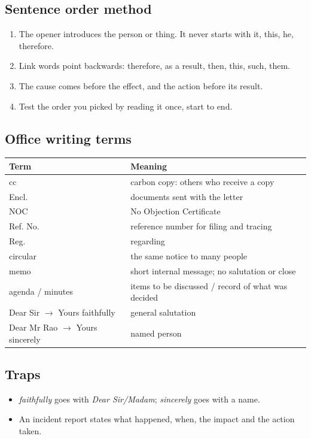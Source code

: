 \documentclass[11pt,a4paper]{article}
\begin{document}
\subsection*{Sentence order method}
\begin{enumerate}
\item The opener introduces the person or thing. It never starts with it, this, he, therefore.
\item Link words point backwards: therefore, as a result, then, this, such, them.
\item The cause comes before the effect, and the action before its result.
\item Test the order you picked by reading it once, start to end.
\end{enumerate}
\subsection*{Office writing terms}
\begin{center}\small\renewcommand{\arraystretch}{1.2}
\begin{tabularx}{\linewidth}{@{}>{\raggedright\arraybackslash}p{3.8cm} >{\raggedright\arraybackslash}X@{}}
\toprule
\textbf{Term} & \textbf{Meaning}\\
\midrule
cc & carbon copy: others who receive a copy\\
Encl. & documents sent with the letter\\
NOC & No Objection Certificate\\
Ref. No. & reference number for filing and tracing\\
Reg. & regarding\\
circular & the same notice to many people\\
memo & short internal message; no salutation or close\\
agenda / minutes & items to be discussed / record of what was decided\\
Dear Sir $\rightarrow$ Yours faithfully & general salutation\\
Dear Mr Rao $\rightarrow$ Yours sincerely & named person\\
\bottomrule
\end{tabularx}
\end{center}
\subsection*{Traps}
\begin{itemize}
\item \emph{faithfully} goes with \emph{Dear Sir/Madam}; \emph{sincerely} goes with a name.
\item An incident report states what happened, when, the impact and the action taken.
\end{itemize}
\end{document}
